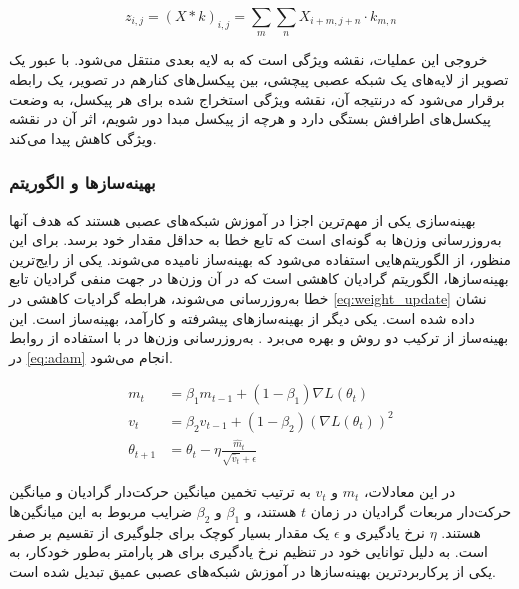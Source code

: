 \begin{latin}
\begin{equation}
\label{eq:convolution}
z_{i,j} = (X * k)_{i,j} = \sum_{m}\sum_{n} X_{i+m,j+n} \cdot k_{m,n}
\end{equation}
\end{latin}

خروجی این عملیات، نقشه ویژگی
 است که به لایه بعدی منتقل می‌شود. با عبور یک تصویر از لایه‌های یک شبکه عصبی پیچشی، بین پیکسل‌های کنارهم در تصویر، یک رابطه برقرار می‌شود که درنتیجه آن، نقشه ویژگی استخراج شده برای هر پیکسل،‌ به وضعت پیکسل‌های اطرافش بستگی دارد و هرچه از پیکسل مبدا دور شویم، اثر آن در نقشه ویژگی کاهش پیدا می‌کند.
 
 




\subsubsection{بهینه‌سازها و الگوریتم 
}

بهینه‌سازی یکی از مهم‌ترین اجزا در آموزش شبکه‌های عصبی هستند که هدف آنها به‌روزرسانی وزن‌ها به گونه‌ای است که تابع خطا به حداقل مقدار خود برسد. برای این منظور، از الگوریتم‌هایی استفاده می‌شود که بهینه‌ساز نامیده می‌شوند. 
یکی از رایج‌ترین بهینه‌سازها، الگوریتم گرادیان کاهشی است که در آن وزن‌ها در جهت منفی گرادیان تابع خطا به‌روزرسانی می‌شوند، هرابطه گرادیات کاهشی در \autoref{eq:weight_update} نشان داده شده است. 
 یکی دیگر از بهینه‌سازهای پیشرفته و کارآمد، بهینه‌ساز 
 است. این بهینه‌ساز از ترکیب دو روش
 و
 بهره می‌برد 
 \cite{towardsdatascienceUnderstandingDeep,mediumMomentumRMSpropAdam}.
  به‌روزرسانی وزن‌ها در  با استفاده از روابط در 
  \autoref{eq:adam}
  انجام می‌شود.

\begin{latin}
\begin{equation}
\label{eq:adam}
\begin{aligned}
m_t &= \beta_1 m_{t-1} + (1 - \beta_1) \nabla L(\theta_t)\\
v_t &= \beta_2 v_{t-1} + (1 - \beta_2) (\nabla L(\theta_t))^2\\
\theta_{t+1} &= \theta_t - \eta \frac{\hat{m}_t}{\sqrt{\hat{v}_t} + \epsilon}
\end{aligned}
\end{equation}
\end{latin}


در این معادلات، \(m_t\) و \(v_t\) به ترتیب تخمین میانگین حرکت‌دار گرادیان و میانگین حرکت‌دار مربعات گرادیان در زمان \(t\) هستند، و \(\beta_1\) و \(\beta_2\) ضرایب مربوط به این میانگین‌ها هستند. \(\eta\) نرخ یادگیری و \(\epsilon\) یک مقدار بسیار کوچک برای جلوگیری از تقسیم بر صفر است. 
 به دلیل توانایی خود در تنظیم نرخ یادگیری برای هر پارامتر به‌طور خودکار، به یکی از پرکاربردترین بهینه‌سازها در آموزش شبکه‌های عصبی عمیق تبدیل شده است. 



